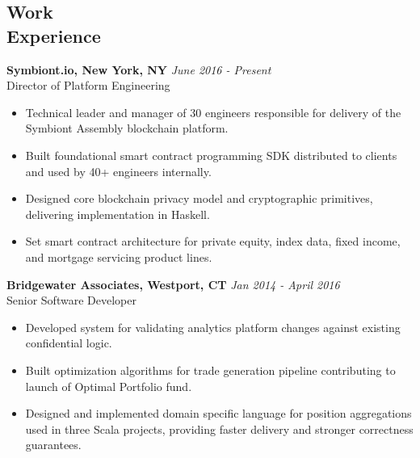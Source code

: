 \documentclass[margin]{res}
\begin{document}
 
 

\address{{\bf Contact} \\ jobs@aarontodd.name \\ (415) 847-0997 }

\address{{\bf Address} \\ 70 Pine St. Apt 928 \\ New York, NY 10005 }


\begin{resume} 
  
\section{Work \\ Experience}

{\bf Symbiont.io, New York, NY} \hfill \textit{June 2016 - Present} \\
Director of Platform Engineering
\begin{itemize} 	\itemsep -2pt
\item Technical leader and manager of 30 engineers responsible for delivery of the Symbiont Assembly blockchain platform.
\item Built foundational smart contract programming SDK distributed to clients and used by 40+ engineers internally.
\item Designed core blockchain privacy model and cryptographic primitives, delivering implementation in Haskell.
\item Set smart contract architecture for private equity, index data, fixed income, and mortgage servicing product lines.
\end{itemize}

 {\bf Bridgewater Associates, Westport, CT} \hfill \textit{Jan 2014 - April 2016} \\
 Senior Software Developer
 \begin{itemize} \itemsep -2pt  %
 \item Developed system for validating analytics platform changes against existing confidential logic.
 \item Built optimization algorithms for trade generation pipeline contributing to launch of Optimal Portfolio fund.
 \item Designed and implemented domain specific language for position aggregations used in three Scala projects, providing faster delivery and stronger correctness guarantees.
 \end{itemize}


\end{resume}
\end{document}
